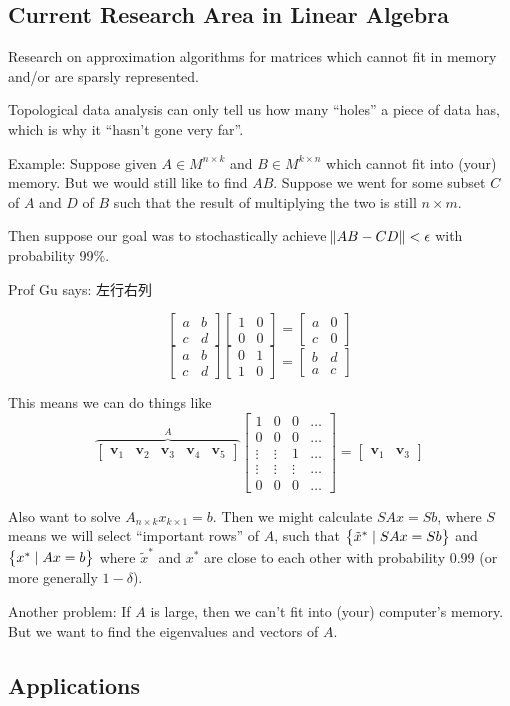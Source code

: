 \documentclass{article}
\renewcommand{\m}[1]{\begin{bmatrix} #1 \end{bmatrix}}
\begin{document}
\subsection{Current Research Area in Linear Algebra}
Research on approximation algorithms for matrices which cannot fit in memory and/or are sparsly represented.

Topological data analysis can only tell us how many ``holes'' a piece of data has, which is why it ``hasn't gone very far''.

Example: Suppose given \(A \in M^{n \times k}\) and \(B \in M^{k \times n}\) which cannot fit into (your) memory.
But we would still like to find \(AB\).
Suppose we went for some subset \(C\) of \(A\) and \(D\) of \(B\) such that
the result of multiplying the two is still \(n \times m\).

Then suppose our goal was to stochastically achieve \(\norm{AB - CD} < \epsilon\) with probability 99\%.

Prof Gu says: 左行右列

\[\m{a & b\\c &d}\m{1 & 0\\ 0 & 0} = \m{a & 0\\ c & 0}\]
\[\m{a & b\\c &d}\m{0 & 1\\ 1 & 0} = \m{b & d\\ a & c}\]

This means we can do things like
\[\overbrace{\m{\bm v_1 & \bm v_2 & \bm v_3& \bm v_4& \bm v_5}}^A\m{1 & 0 & 0 & \dots\\0 & 0 & 0 & \dots\\ \vdots & \vdots & 1&\dots\\\vdots & \vdots & \vdots&\dots  \\ 0 & 0 & 0 & \dots} = \m{\bm v_1 & \bm v_3}\]

Also want to solve \(A_{n \times k}x_{k \times 1} = b\).
Then we might calculate \(SAx = Sb\), where \(S\) means we will select ``important rows'' of \(A\), such that \(\set{\tilde x^*\mid SAx = Sb}\) and \(\set{x^* \mid Ax = b}\) where \(\tilde x^*\) and \(x^*\) are close to each other with probability 0.99 (or more generally \(1 - \delta\)).

Another problem: If \(A\) is large, then we can't fit into (your) computer's memory.
But we want to find the eigenvalues and vectors of \(A\).

\subsection{Applications}
\end{document}
